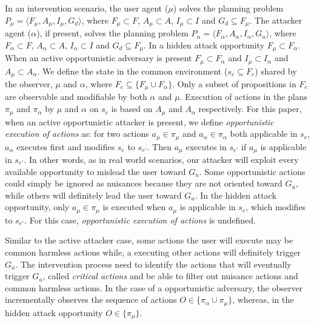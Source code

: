 In an intervention scenario, the user agent ($\mu$) solves the planning problem $P_{\mu}=\langle F_{\mu},A_{\mu},I_{\mu},G_{d} \rangle$, where $F_{\mu} \subset F$, $A_{\mu} \subset A$, $I_{\mu} \subset I$ and $G_{d} \subseteq F_{\mu}$. The attacker agent ($\alpha$), if present,  solves the planning problem $P_{\alpha}=\langle F_{\alpha},A_{\alpha},I_{\alpha},G_{u} \rangle$, where $F_{\alpha} \subset F$, $A_{\alpha} \subset A$, $I_{\alpha} \subset I$ and $G_{d} \subseteq F_{\mu}$. In a hidden attack opportunity  $F_{\mu} \subset F_{\alpha}$. When an active opportunistic adversary is present  $F_{\mu} \subset F_{\alpha}$ and $I_{\mu} \subset I_{\alpha}$ and  $A_{\mu} \subset A_{\alpha}$. We define the state in the common environment ($s_e \subseteq F_e$) shared by the observer, $\mu$ and $\alpha$, where $F_e \subseteq \lbrace F_{\mu} \cup F_{\alpha}\rbrace$. Only a subset of propositions in $F_e$ are observable and modifiable by both $\alpha$ and $\mu$. Execution of actions in the plans $\pi_{\mu}$ and $\pi_{\alpha}$ by $\mu$ and $\alpha$ on $s_e$ is based on $A_{\mu}$ and $A_{\alpha}$ respectively. For this paper, when an active opportunistic attacker is present, we define \textit{opportunistic execution of actions} as: for two actions $a_{\mu} \in \pi_{\mu}$ and $a_{\alpha} \in \pi_{\alpha}$ both applicable in $s_e$, $a_{\alpha}$ executes first and modifies $s_e$ to $s_{e\prime}$. Then $a_{\mu}$ executes in $s_{e\prime}$ if $a_{\mu}$ is applicable in $s_{e\prime}$. In other words, as in real world scenarios, our attacker will exploit every available opportunity to mislead the user toward $G_u$. Some opportunistic actions could simply be ignored as nuisances because they are not oriented toward $G_u$, while others will definitely lead the user toward $G_u$. In the hidden attack opportunity, only $a_{\mu} \in \pi_{\mu}$ is executed when $a_{\mu}$ is applicable in $s_e$, which modifies to $s_{e\prime}$. For this case, \textit{opportunistic execution of actions} is undefined. 

Similar to the active attacker case, some actions the user will execute may be common harmless actions while, a executing other actions will definitely trigger $G_u$. The intervention process need to identify the actions that will eventually trigger $G_u$, called \textit{critical actions} and be able to filter out nuisance actions and common harmless actions. In the case of a opportunistic adversary, the observer incrementally observes the sequence of actions $O \in \lbrace\pi_\alpha\cup \pi_\mu\rbrace$, whereas, in the hidden attack opportunity $O \in \lbrace\pi_\mu\rbrace$.

